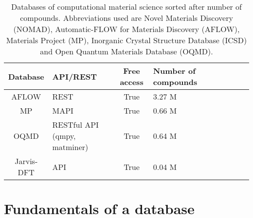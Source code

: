 \begin{table}[!ht]
\centering
\begin{tabular}{clclclclc}
  \hline
  \hline
  Database & API/REST & Free access & Number of compounds \\
  \hline
  AFLOW \cite{Curtarolo2012} & REST & True &  3.27 M\\
  MP \cite{Jain2013}   & MAPI \cite{Ong2015} & True &  0.66 M\\
  OQMD \cite{Kirklin2015, Saal2013} & RESTful API (qmpy, matminer)& True &  0.64 M\\
  Jarvis-DFT \cite{Choudhary2020} & API & True &  0.04 M\\
  \hline
  \hline
\end{tabular}
\caption{Databases of computational material science sorted after number of compounds. Abbreviations used are Novel Materials Discovery (NOMAD), Automatic-FLOW for Materials Discovery (AFLOW), Materials Project (MP), Inorganic Crystal Structure Database (ICSD) and Open Quantum Materials Database (OQMD).}
\label{tab:databases}
\end{table}

\begin{table}[!ht]
\centering
\noindent{}
\caption{Cloud services that offers database-storage. Abbreviations used are Computational Materials Repository (CMR), NIMS Materials Database (MatNavi), PRedictive Integrated Structural Materials Science (PRISMS), Materials Platform for Data Science (MPDS) and the Materials Data Fascility (MDF).}
\label{tab:cloud_service}
\end{table}

\clearpage

\section{Fundamentals of a database}

